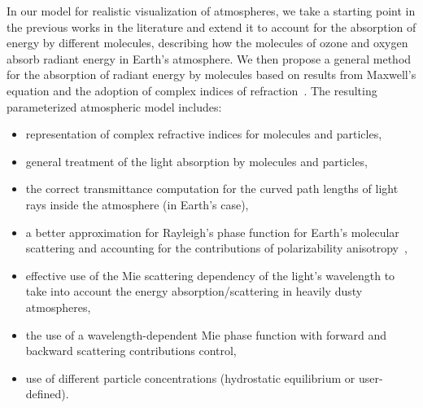 \documentclass[journal]{vgtc}                %
\newcommand{\CS}[1]{\textbf{[CS~} \textcolor{orange}{#1} \textbf{~]}}
\newcommand{\anderscomment}[1]{\textbf{[AY~} \textcolor{cyan}{#1} \textbf{~]}}
\newcommand{\review}[1]{{\color{blue}#1}}
\begin{document}
In our model for realistic visualization of atmospheres, we take a starting point in the previous works in the literature and extend it to account for the absorption of energy by different molecules, describing how the molecules of ozone and oxygen \review{absorb} radiant energy in Earth's atmosphere. \review{We then} propose a general method for the absorption of radiant energy by molecules based on results from Maxwell's equation and the adoption of complex \review{indices} of refraction~\cite{Bohren:1983}. The resulting parameterized atmospheric model \review{includes}: 
\vspace{-1mm}
\begin{itemize}
	\item representation of complex refractive indices for molecules and particles,
	\vspace{-2.5mm}
	\item general treatment of the light absorption by molecules and particles,
	\vspace{-2.5mm}	\item the correct transmittance computation for the curved path lengths of light rays inside the atmosphere (in Earth's case),
	\vspace{-2.5mm}	\item \review{a better approximation for Rayleigh's phase function for Earth's molecular scattering and accounting for the contributions of polarizability anisotropy~\cite{Rayleigh:1871},}
	\vspace{-2.5mm}	\item effective use of the Mie scattering\cite{Mishchenko:2006}  dependency of the light's wavelength to take into account the energy absorption/scattering in heavily dusty atmospheres,
	\vspace{-2.5mm}	\item \review{the use of a wavelength-dependent Mie phase function with  
    forward and backward scattering contributions control,}
	\vspace{-2.5mm}	\item use of different particle concentrations (hydrostatic equilibrium or user-defined).
	\vspace{-1mm}
\end{itemize}
\end{document}
